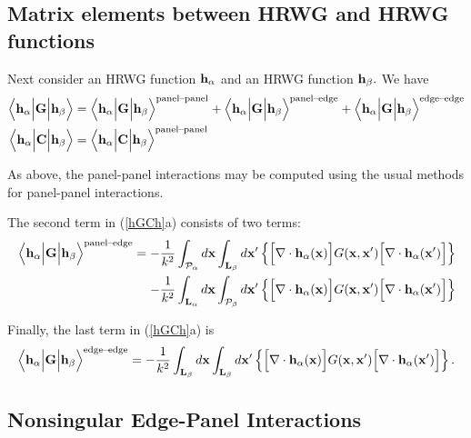 \documentclass[letterpaper]{article}
\begin{document}
\subsection{Matrix elements between HRWG and HRWG functions}

Next consider an HRWG function $\mathbf{h}_\alpha$ and an HRWG function
$\mathbf{h}_\beta.$ We have 
\begin{subequations}
\begin{align}
  \Big\langle \mathbf{h}_\alpha \Big| \mathbf{G} \Big| \mathbf{h}_\beta \Big\rangle
&=
  \Big\langle \mathbf{h}_\alpha \Big| \mathbf{G} \Big| \mathbf{h}_\beta \Big\rangle^{\hbox{\scriptsize{panel--panel}}}
+
  \Big\langle \mathbf{h}_\alpha \Big| \mathbf{G} \Big| \mathbf{h}_\beta \Big\rangle^{\hbox{\scriptsize{panel--edge}}}
+
  \Big\langle \mathbf{h}_\alpha \Big| \mathbf{G} \Big| \mathbf{h}_\beta \Big\rangle^{\hbox{\scriptsize{edge--edge}}}
\\
  \Big\langle \mathbf{h}_\alpha \Big| \mathbf{C} \Big| \mathbf{h}_\beta \Big\rangle
&=
  \Big\langle \mathbf{h}_\alpha \Big| \mathbf{C} \Big| \mathbf{h}_\beta \Big\rangle^{\hbox{\scriptsize{panel--panel}}}
\end{align}
\label{hGCh}
\end{subequations}

As above, the panel-panel interactions may be computed using 
the usual \lss methods for panel-panel interactions.

The second term in (\ref{hGCh}a) consists of two terms:
\begin{align*}
\Big\langle \mathbf{h}_\alpha \Big| \mathbf{G} \Big| \mathbf{h}_\beta \Big\rangle^{\hbox{\scriptsize{panel--edge}}}
= -&\frac{1}{k^2}
   \int_{\mathcal{P}_\alpha} d\mathbf{x}
   \int_{\mathbf{L}_\beta} d\mathbf{x}^\prime
   \left\{ \Big[\nabla \cdot \mathbf{h}_\alpha(\mathbf{x})\Big]
           G(\mathbf{x}, \mathbf{x}^\prime)
           \Big[\nabla \cdot \mathbf{h}_\alpha(\mathbf{x}^\prime)\Big]
   \right\}
\\
 -&\frac{1}{k^2}
   \int_{\mathbf{L}_\alpha} d\mathbf{x}
   \int_{\mathcal{P}_\beta} d\mathbf{x}^\prime
   \left\{ \Big[\nabla \cdot \mathbf{h}_\alpha(\mathbf{x})\Big]
           G(\mathbf{x}, \mathbf{x}^\prime)
           \Big[\nabla \cdot \mathbf{h}_\alpha(\mathbf{x}^\prime)\Big]
   \right\}
\end{align*}

Finally, the last term in (\ref{hGCh}a) is
\begin{align*}
\Big\langle \mathbf{h}_\alpha \Big| \mathbf{G} \Big| \mathbf{h}_\beta \Big\rangle^{\hbox{\scriptsize{edge--edge}}}
= -\frac{1}{k^2}
   \int_{\mathbf{L}_\beta} d\mathbf{x}
   \int_{\mathbf{L}_\beta} d\mathbf{x}^\prime
   \left\{ \Big[\nabla \cdot \mathbf{h}_\alpha(\mathbf{x})\Big]
           G(\mathbf{x}, \mathbf{x}^\prime)
           \Big[\nabla \cdot \mathbf{h}_\alpha(\mathbf{x}^\prime)\Big]
   \right\}.
\end{align*}

\subsection*{Nonsingular Edge-Panel Interactions}
\end{document}
